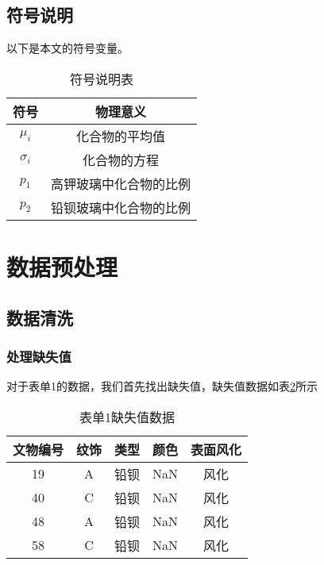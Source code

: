 \documentclass[withoutpreface,bwprint]{cumcmthesis} %
\begin{document}
\subsection{符号说明}

以下是本文的符号变量。

\begin{table}[!h]
	\centering
	\caption{符号说明表}
	\label{fuhao}
	\begin{tabular}{@{}cc@{}}
		\toprule
		\textbf{符号}  & \textbf{物理意义} \\ \midrule
		$\mu_i $     & 化合物的平均值       \\
		$\sigma _i $ & 化合物的方程        \\
		$p_1$        & 高钾玻璃中化合物的比例   \\
		$p_2$        & 铅钡玻璃中化合物的比例   \\ \bottomrule
	\end{tabular}
\end{table}

\section{数据预处理}
\subsection{数据清洗}
\subsubsection{处理缺失值}
对于表单1的数据，我们首先找出缺失值，缺失值数据如表\ref{queshi}所示

\begin{table}[!h]
	\centering
	\small
	\caption{表单1缺失值数据}
	\label{queshi}
	\begin{tabular}{@{}ccccc@{}}
		\toprule
		\textbf{文物编号} & \textbf{纹饰} & \textbf{类型} & \textbf{颜色} & \textbf{表面风化} \\ \midrule
		19            & A           & 铅钡          & NaN         & 风化            \\
		40            & C           & 铅钡          & NaN         & 风化            \\
		48            & A           & 铅钡          & NaN         & 风化            \\
		58            & C           & 铅钡          & NaN         & 风化            \\ \bottomrule
	\end{tabular}
\end{table}
\end{document}
